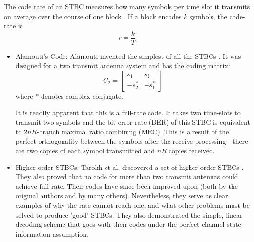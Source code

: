 The code rate of an STBC measures how many symbols per time slot it
transmits on average over the course of one block \cite{17}. If a
block encodes $k$ symbols, the code-rate is
\[r=\frac{k}{T}\]
\begin{itemize}
\item Alamouti's Code: Alamouti invented the simplest of all the STBCs \cite{11}. It was designed for a two transmit antenna system and has the coding matrix:
\[C_2=
\left[\begin{array}{cc}
s_1 & s_2\\
-s_2^* & -s_1^*
\end{array} \right]\]
where $*$ denotes complex conjugate.

It is readily apparent that this is a full-rate code. It takes two
time-slots to transmit two symbols and the bit-error rate (BER) of
this STBC is equivalent to $2nR$-branch maximal ratio combining
(MRC). This is a result of the perfect orthogonality between the
symbols after the receive processing - there are two copies of each
symbol transmitted and $nR$ copies received.

\item Higher order STBCs: Tarokh et al. discovered a set of higher order STBCs \cite{17, 18}. They also proved that no code for more than two transmit antennas could achieve full-rate. Their codes have since been improved upon (both by the original authors and by many others). Nevertheless, they serve as clear examples of why the rate cannot reach one, and what other problems must be solved to produce 'good' STBCs. They also demonstrated the simple, linear decoding scheme that goes with their codes under the perfect channel state information assumption.


\end{itemize}
